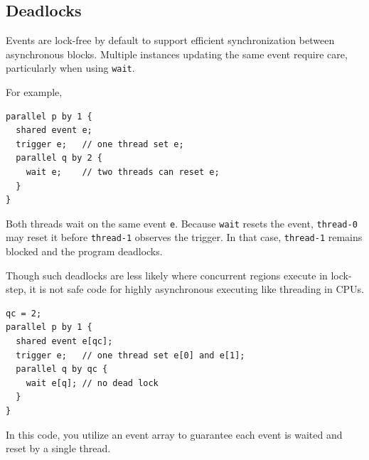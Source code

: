 \subsection*{Deadlocks}

Events are lock-free by default to support efficient synchronization between asynchronous blocks. Multiple instances updating the same event require care, particularly when using \texttt{wait}.

For example,

\begin{lstlisting}[language=croqtile,caption={A single-instance deadlock}]
parallel p by 1 {
  shared event e;
  trigger e;   // one thread set e;
  parallel q by 2 {
    wait e;    // two threads can reset e;
  }
}
\end{lstlisting}

Both threads wait on the same event \texttt{e}. Because \texttt{wait} resets the event, \texttt{thread-0} may reset it before \texttt{thread-1} observes the trigger. In that case, \texttt{thread-1} remains blocked and the program deadlocks.

Though such deadlocks are less likely where concurrent regions execute in lock-step, it is not safe code for highly asynchronous executing like threading in CPUs.

\begin{lstlisting}[language=croqtile,caption={One trigger per waiter}]
qc = 2;
parallel p by 1 {
  shared event e[qc];
  trigger e;   // one thread set e[0] and e[1];
  parallel q by qc {
    wait e[q]; // no dead lock
  }
}
\end{lstlisting}

In this code, you utilize an event array to guarantee each event is waited and reset by a single thread.
